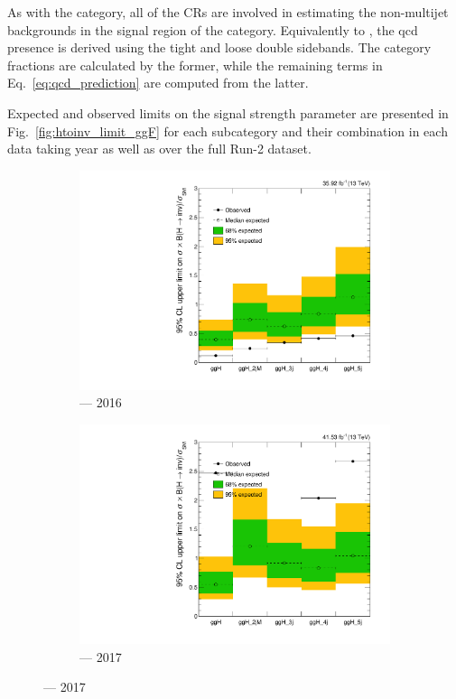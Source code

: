 As with the \VH category, all of the \glspl{CR} are involved in estimating the non-multijet backgrounds in the signal region of the \ggH category. Equivalently to \ttH, the \acrshort{qcd} presence is derived using the tight and loose double sidebands. The category fractions \catFraction are calculated by the former, while the remaining terms in Eq.~\ref{eq:qcd_prediction} are computed from the latter.

Expected and observed limits on the signal strength parameter are presented in Fig.~\ref{fig:htoinv_limit_ggF} for each \ggH subcategory and their combination in each data taking year as well as over the full Run-2 dataset.

\begin{figure}[htbp]
    \centering
    \begin{subfigure}[b]{0.45\textwidth}
        \includegraphics[width=\textwidth]{figures/limits/ggF/limit_2016_ggF.pdf}
        \caption{\ggH --- 2016}
    \end{subfigure}
    \hfill
    \begin{subfigure}[b]{0.45\textwidth}
        \includegraphics[width=\textwidth]{figures/limits/ggF/limit_2017_ggF.pdf}
        \caption{\ggH --- 2017}
    \end{subfigure}


\end{figure}
